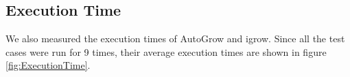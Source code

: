 \documentclass[10pt,conference,letterpaper]{IEEEtran}
\begin{document}

\subsection{Execution Time}
We also measured the execution times of AutoGrow and igrow.
Since all the test cases were run for 9 times, their average execution times are shown in figure \ref{fig:ExecutionTime}.

\end{document}

